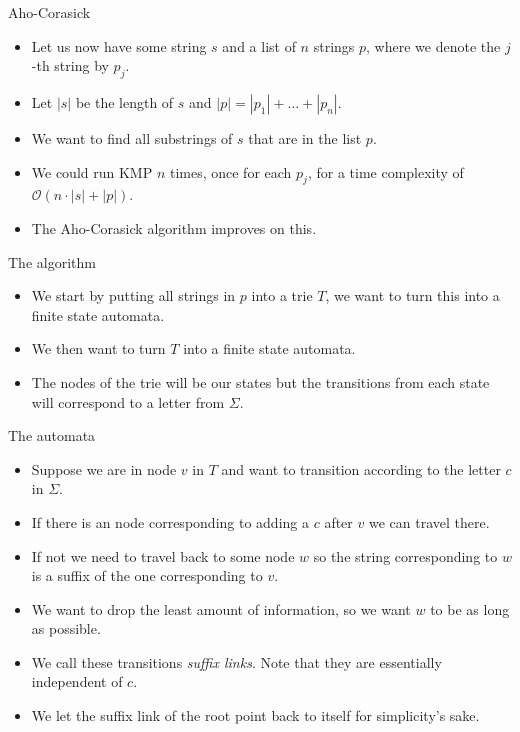 \documentclass{beamer}
\begin{document}
\begin{frame}[plain]{Aho-Corasick}
	\begin{itemize}
        \item Let us now have some string $s$ and a list of $n$ strings $p$, where we denote the $j$-th string by $p_j$.
        \item Let $|s|$ be the length of $s$ and $|p| = |p_1| + \dots + |p_n|$.
        \item We want to find all substrings of $s$ that are in the list $p$.
        \item We could run KMP $n$ times, once for each $p_j$, for a time complexity of $\mathcal{O}(n \cdot |s| + |p|)$.
        \item The Aho-Corasick algorithm improves on this.
    \end{itemize}
\end{frame}

\begin{frame}[plain]{The algorithm}
	\begin{itemize}
        \item We start by putting all strings in $p$ into a trie $T$, we want to turn this into a finite state automata.
        \item We then want to turn $T$ into a finite state automata.
        \item The nodes of the trie will be our states but the transitions from each state will correspond to a letter from $\Sigma$.
    \end{itemize}
\end{frame}

\begin{frame}[plain]{The automata}
	\begin{itemize}
        \item Suppose we are in node $v$ in $T$ and want to transition according to the letter $c$ in $\Sigma$.
        \item If there is an node corresponding to adding a $c$ after $v$ we can travel there.
        \item If not we need to travel back to some node $w$ so the string corresponding to $w$ is a suffix of the one corresponding to $v$.
        \item We want to drop the least amount of information, so we want $w$ to be as long as possible.
        \item We call these transitions \emph{suffix links}. Note that they are essentially independent of $c$.
        \item We let the suffix link of the root point back to itself for simplicity's sake.
    \end{itemize}
\end{frame}
\end{document}
